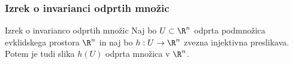 \documentclass{beamer}
\begin{document}
\begin{frame}
\frametitle{Izrek o invarianci odprtih množic}
\begin{block}{Izrek o invarianco odprtih množic}
Naj bo $U \subset \R^n$ odprta podmnožica evklidskega prostora $\R^n$ in naj bo $h : U \rightarrow \R^n$ zvezna injektivna preslikava.
Potem je tudi slika $h(U)$ odprta množica v $\R^n$.
\end{block}
\end{frame}
\end{document}
